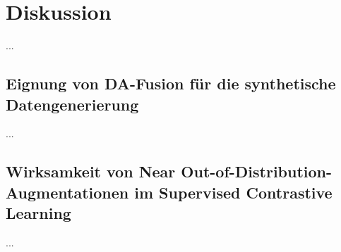 \chapter{Diskussion} \label{sec:discussion}

...


\section{Eignung von DA-Fusion für die synthetische Datengenerierung} \label{sec:da-fusion-discussion}

...

\section{Wirksamkeit von Near Out-of-Distribution-Augmentationen im Supervised Contrastive Learning} \label{sec:ood-discussion}

...